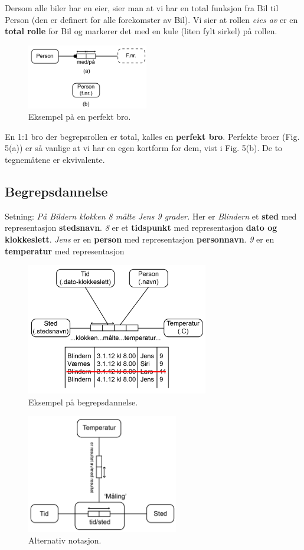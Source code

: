 \documentclass[11pt,a4paper]{article}
\begin{document}
Dersom alle biler har en eier, sier man at vi har en total funksjon fra Bil til Person (den er definert for alle forekomster av Bil).
Vi sier at rollen \textit{eies av} er en \textbf{total rolle} for Bil og markerer det med en kule (liten fylt sirkel) på rollen. 

\begin{figure}[h!]
	\centering
		\includegraphics[width=200px]{img/perf-01.png}
	\caption{Eksempel på en perfekt bro.}
\end{figure}

En 1:1 bro der begrepsrollen er total, kalles en \textbf{perfekt bro}. Perfekte broer (Fig. 5(a)) er så vanlige at vi har en egen kortform for dem, vist i Fig. 5(b). De to tegnemåtene er ekvivalente.

\subsection{Begrepsdannelse}
Setning: \textit{På Bildern klokken 8 målte Jens 9 grader.} Her er \textit{Blindern} et \textbf{sted} med representasjon \textbf{stedsnavn}. \textit{8} er et \textbf{tidspunkt} med representasjon \textbf{dato og klokkeslett}. \textit{Jens} er en \textbf{person} med representasjon \textbf{personnavn}. \textit{9} er en \textbf{temperatur} med representasjon \textbf{\celsius}

\begin{figure}[h!]
	\centering
		\includegraphics[width=300px]{img/2-01.png}
	\caption{Eksempel på begrepsdannelse.}
\end{figure}

\begin{figure}[h!]
	\centering
		\includegraphics[width=250px]{img/alt-01.png}
	\caption{Alternativ notasjon.}
\end{figure}
\end{document}
